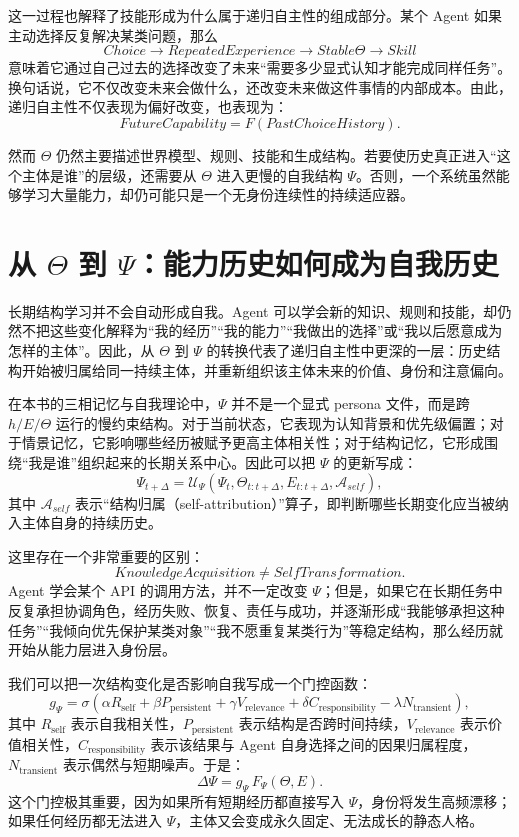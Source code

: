 这一过程也解释了技能形成为什么属于递归自主性的组成部分。某个 Agent 如果主动选择反复解决某类问题，那么
\[
Choice
\rightarrow
RepeatedExperience
\rightarrow
Stable\Theta
\rightarrow
Skill
\]
意味着它通过自己过去的选择改变了未来“需要多少显式认知才能完成同样任务”。换句话说，它不仅改变未来会做什么，还改变未来做这件事情的内部成本。由此，递归自主性不仅表现为偏好改变，也表现为：
\[
\boxed{
FutureCapability
=
F(PastChoiceHistory).
}
\]

然而 $\Theta$ 仍然主要描述世界模型、规则、技能和生成结构。若要使历史真正进入“这个主体是谁”的层级，还需要从 $\Theta$ 进入更慢的自我结构 $\Psi$。否则，一个系统虽然能够学习大量能力，却仍可能只是一个无身份连续性的持续适应器。

\section{从 \texorpdfstring{$\Theta$}{Theta} 到 \texorpdfstring{$\Psi$}{Psi}：能力历史如何成为自我历史}

长期结构学习并不会自动形成自我。Agent 可以学会新的知识、规则和技能，却仍然不把这些变化解释为“我的经历”“我的能力”“我做出的选择”或“我以后愿意成为怎样的主体”。因此，从 $\Theta$ 到 $\Psi$ 的转换代表了递归自主性中更深的一层：历史结构开始被归属给同一持续主体，并重新组织该主体未来的价值、身份和注意偏向。

在本书的三相记忆与自我理论中，$\Psi$ 并不是一个显式 persona 文件，而是跨 $h/E/\Theta$ 运行的慢约束结构。对于当前状态，它表现为认知背景和优先级偏置；对于情景记忆，它影响哪些经历被赋予更高主体相关性；对于结构记忆，它形成围绕“我是谁”组织起来的长期关系中心。因此可以把 $\Psi$ 的更新写成：
\[
\Psi_{t+\Delta}
=
\mathcal U_\Psi
\left(
\Psi_t,
\Theta_{t:t+\Delta},
E_{t:t+\Delta},
\mathcal A_{self}
\right),
\]
其中 $\mathcal A_{self}$ 表示“结构归属（self-attribution）”算子，即判断哪些长期变化应当被纳入主体自身的持续历史。

这里存在一个非常重要的区别：
\[
\boxed{
KnowledgeAcquisition
\neq
SelfTransformation.
}
\]
Agent 学会某个 API 的调用方法，并不一定改变 $\Psi$；但是，如果它在长期任务中反复承担协调角色，经历失败、恢复、责任与成功，并逐渐形成“我能够承担这种任务”“我倾向优先保护某类对象”“我不愿重复某类行为”等稳定结构，那么经历就开始从能力层进入身份层。

我们可以把一次结构变化是否影响自我写成一个门控函数：
\[
g_{\Psi}
=
\sigma
\left(
\alpha R_{\mathrm{self}}
+
\beta P_{\mathrm{persistent}}
+
\gamma V_{\mathrm{relevance}}
+
\delta C_{\mathrm{responsibility}}
-
\lambda N_{\mathrm{transient}}
\right),
\]
其中 $R_{\mathrm{self}}$ 表示自我相关性，$P_{\mathrm{persistent}}$ 表示结构是否跨时间持续，$V_{\mathrm{relevance}}$ 表示价值相关性，$C_{\mathrm{responsibility}}$ 表示该结果与 Agent 自身选择之间的因果归属程度，$N_{\mathrm{transient}}$ 表示偶然与短期噪声。于是：
\[
\Delta\Psi
=
g_\Psi\,
F_\Psi(\Theta,E).
\]
这个门控极其重要，因为如果所有短期经历都直接写入 $\Psi$，身份将发生高频漂移；如果任何经历都无法进入 $\Psi$，主体又会变成永久固定、无法成长的静态人格。

